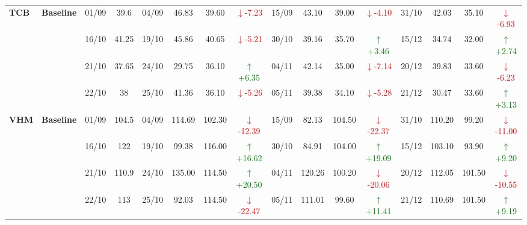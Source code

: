 {\begin{longtable}{llcc|cccc|cccc|cccc}
\multirow{4}{*}{\textbf{TCB}}
& \textbf{Baseline}
& 01/09 & 39.6 & 04/09 & 46.83 & 39.60 & \textcolor{red}{\(\downarrow\)-7.23} & 15/09 & 43.10 & 39.00 & \textcolor{red}{\(\downarrow\)-4.10} & 31/10 & 42.03 & 35.10 & \textcolor{red}{\(\downarrow\)-6.93} \\
& & 16/10 & 41.25 & 19/10 & 45.86 & 40.65 & \textcolor{red}{\(\downarrow\)-5.21} & 30/10 & 39.16 & 35.70 & \textcolor{green}{\(\uparrow\)+3.46} & 15/12 & 34.74 & 32.00 & \textcolor{green}{\(\uparrow\)+2.74} \\
& & 21/10 & 37.65 & 24/10 & 29.75 & 36.10 & \textcolor{green}{\(\uparrow\)+6.35} & 04/11 & 42.14 & 35.00 & \textcolor{red}{\(\downarrow\)-7.14} & 20/12 & 39.83 & 33.60 & \textcolor{red}{\(\downarrow\)-6.23} \\
& & 22/10 & 38 & 25/10 & 41.36 & 36.10 & \textcolor{red}{\(\downarrow\)-5.26} & 05/11 & 39.38 & 34.10 & \textcolor{red}{\(\downarrow\)-5.28} & 21/12 & 30.47 & 33.60 & \textcolor{green}{\(\uparrow\)+3.13} \\
\midrule

\multirow{4}{*}{\textbf{VHM}}
& \textbf{Baseline}
& 01/09 & 104.5 & 04/09 & 114.69 & 102.30 & \textcolor{red}{\(\downarrow\)-12.39} & 15/09 & 82.13 & 104.50 & \textcolor{red}{\(\downarrow\)-22.37} & 31/10 & 110.20 & 99.20 & \textcolor{red}{\(\downarrow\)-11.00} \\
& & 16/10 & 122 & 19/10 & 99.38 & 116.00 & \textcolor{green}{\(\uparrow\)+16.62} & 30/10 & 84.91 & 104.00 & \textcolor{green}{\(\uparrow\)+19.09} & 15/12 & 103.10 & 93.90 & \textcolor{green}{\(\uparrow\)+9.20} \\
& & 21/10 & 110.9 & 24/10 & 135.00 & 114.50 & \textcolor{green}{\(\uparrow\)+20.50} & 04/11 & 120.26 & 100.20 & \textcolor{red}{\(\downarrow\)-20.06} & 20/12 & 112.05 & 101.50 & \textcolor{red}{\(\downarrow\)-10.55} \\
& & 22/10 & 113 & 25/10 & 92.03 & 114.50 & \textcolor{red}{\(\downarrow\)-22.47} & 05/11 & 111.01 & 99.60 & \textcolor{green}{\(\uparrow\)+11.41} & 21/12 & 110.69 & 101.50 & \textcolor{green}{\(\uparrow\)+9.19} \\
\midrule


\end{longtable}}
